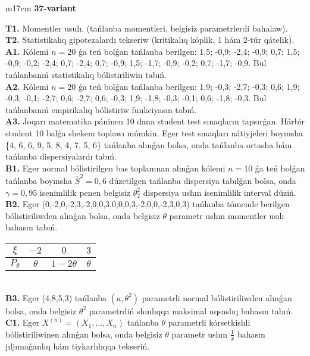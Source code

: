 \documentclass{article}
\begin{document}
\begin{tabular}{m{17cm}}
\textbf{37-variant}
\newline

\textbf{T1.} 
Momentler usulı. (tańlanba momentleri, belgisiz parametrlerdi bahalaw).
 \\
\textbf{T2.} 
Statistikalıq gipotezalardı tekseriw (kritikalıq kóplik, 1 hám 2-túr qátelik).
 \\
\textbf{A1.} 
Kólemi \(n = 20\) ǵa teń bolǵan tańlanba berilgen: 1,5; -0,9; -2,4; -0,9; 0,7; 1,5; -0,9; -0,2; -2,4; 0,7; -2,4; 0,7; -0,9; 1,5; -1,7; -0,9; -0,2; 0,7; -1,7; -0,9. Bul tańlanbanıń statistikalıq bólistiriliwin tabıń.
 \\
\textbf{A2.} 
Kólemi \(n = 20\) ǵa teń bolǵan tańlanba berilgen: 1,9; -0,3; -2,7; -0,3; 0,6; 1,9; -0,3; -0,1; -2,7; 0,6; -2,7; 0,6; -0,3; 1,9; -1,8; -0,3; -0,1; 0,6; -1,8; -0,3. Bul tańlanbanıń empirikalıq bólistiriw funkciyasın tabıń.
 \\
\textbf{A3.} 
Joqarı matematika páninen 10 dana student test sınaqların tapsırǵan. Hárbir student 10 balǵa shekem toplawı múmkin. Eger test sınaqları nátiyjeleri boyınsha \{4, 6, 6, 9, 5, 8, 4, 7, 5, 6\} tańlanba alınǵan bolsa, onda tańlanba ortasha hám tańlanba dispersiyalardı tabıń.
 \\
\textbf{B1.} 
Eger normal bólistirilgen bas toplamnan alınǵan kólemi \(n = 10\) ǵa teń bolǵan tańlanba boyınsha \({\overline{S}}^{2} = 0,6\) dúzetilgen tańlanba dispersiya tabılǵan bolsa, onda \(\gamma = 0,95\) isenimlilik penen belgisiz \(\theta_{2}^{2}\) dispersiya ushın isenimlilik interval dúziń.
 \\
\textbf{B2.} 
Eger (0,-2,0,-2,3,-2,0,0,3,0,0,0,3,-2,0,0,-2,3,0,3) tańlanba tómende berilgen bólistiriliwden alınǵan bolsa, onda belgisiz \(\theta\) parametr ushın momentler usılı bahasın tabıń.
\begin{tabular}{|c|c|c|c|}
  \hline
$\xi$ & $- 2$  & $0$  & $3$ \\
\hline
\(P_{\theta}\) & \(\theta\) & \(1 - 2\theta\) & \(\theta\) \\
\hline
\end{tabular}
 \\
\textbf{B3.} 
Eger (4,8,5,3) tańlanba \(\left( a,\theta^{2} \right)\) parametrli normal bólistiriliwden alınǵan bolsa, onda belgisiz \(\theta^{2}\) parametrdiń shınlıqqa maksimal uqsaslıq bahasın tabıń.
 \\
\textbf{C1.} 
Eger \(X^{(n)} = \left( X_{1},...,X_{n} \right)\) tańlanba \(\theta\) parametrli kórsetkishli bólistiriliwinen alınǵan bolsa, onda belgisiz \(\theta\) parametr ushın \(\frac{1}{\overline{x}}\) bahasın jıljımaǵanlıq hám tiykarlılıqqa tekseriń.

\end{tabular}
\end{document}
